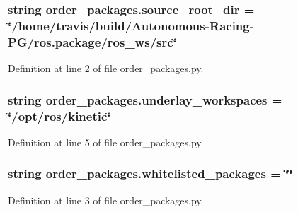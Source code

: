 \subsubsection[{\texorpdfstring{source\+\_\+root\+\_\+dir}{source_root_dir}}]{\setlength{\rightskip}{0pt plus 5cm}string order\+\_\+packages.\+source\+\_\+root\+\_\+dir = \char`\"{}/home/travis/build/Autonomous-\/Racing-\/PG/ros.\+package/ros\+\_\+ws/src\char`\"{}}\hypertarget{namespaceorder__packages_aff4fd297841de7fbddc2c0c33a6bab21}{}\label{namespaceorder__packages_aff4fd297841de7fbddc2c0c33a6bab21}


Definition at line 2 of file order\+\_\+packages.\+py.

\subsubsection[{\texorpdfstring{underlay\+\_\+workspaces}{underlay_workspaces}}]{\setlength{\rightskip}{0pt plus 5cm}string order\+\_\+packages.\+underlay\+\_\+workspaces = \char`\"{}/opt/ros/kinetic\char`\"{}}\hypertarget{namespaceorder__packages_a11d102ff09fd2977b9075c4c722015d2}{}\label{namespaceorder__packages_a11d102ff09fd2977b9075c4c722015d2}


Definition at line 5 of file order\+\_\+packages.\+py.

\subsubsection[{\texorpdfstring{whitelisted\+\_\+packages}{whitelisted_packages}}]{\setlength{\rightskip}{0pt plus 5cm}string order\+\_\+packages.\+whitelisted\+\_\+packages = \char`\"{}\char`\"{}}\hypertarget{namespaceorder__packages_a84450a73e77dbf3689293b97dcb697a4}{}\label{namespaceorder__packages_a84450a73e77dbf3689293b97dcb697a4}


Definition at line 3 of file order\+\_\+packages.\+py.

